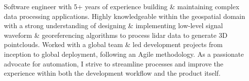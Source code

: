 \begin{justify}
Software engineer with 5+ years of experience building \& maintaining complex data processing applications. Highly knowledgeable within the geospatial domain with a strong understanding of designing \& implementing low-level signal waveform \& georeferencing algorithms to process lidar data to generate 3D pointclouds.  Worked with a global team \& led development projects from inception to global deployment, following an Agile methodology. As a passionate advocate for automation, I strive to streamline processes and improve the experience within both the development workflow and the product itself.
\end{justify}